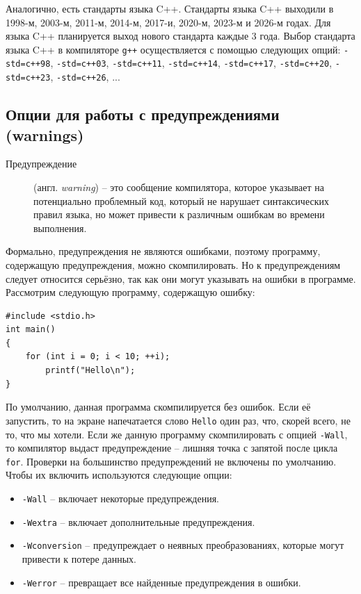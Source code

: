 \documentclass{article}
\begin{document}
Аналогично, есть стандарты языка C++. Стандарты языка C++ выходили в 1998-м, 2003-м, 2011-м, 2014-м, 2017-и, 2020-м, 2023-м и 2026-м годах. Для языка C++ планируется выход нового стандарта каждые 3 года. Выбор стандарта языка C++ в компиляторе \texttt{g++} осуществляется с помощью следующих опций: \texttt{-std=c++98}, \texttt{-std=c++03}, \texttt{-std=c++11}, \texttt{-std=c++14}, \texttt{-std=c++17}, \texttt{-std=c++20}, \texttt{-std=c++23}, \texttt{-std=c++26}, ...

\subsection*{Опции для работы с предупреждениями (warnings)}
\begin{description}
\item[Предупреждение] (англ. \textit{warning}) -- это сообщение компилятора, которое указывает на потенциально проблемный код, который не нарушает синтаксических правил языка, но может привести к различным ошибкам во времени выполнения.
\end{description}
Формально, предупреждения не являются ошибками, поэтому программу, содержащую предупреждения, можно скомпилировать. Но к предупреждениям следует относится серьёзно, так как они могут указывать на ошибки в программе. Рассмотрим следующую программу, содержащую ошибку:
\begin{lstlisting}[style=csMiptCppStyle]
#include <stdio.h>
int main()
{
    for (int i = 0; i < 10; ++i);
        printf("Hello\n");
}
\end{lstlisting}
По умолчанию, данная программа скомпилируется без ошибок. Если её запустить, то на экране напечатается слово \texttt{Hello} один раз, что, скорей всего, не то, что мы хотели. Если же данную программу скомпилировать с опцией \texttt{-Wall}, то компилятор выдаст предупреждение -- лишняя точка с запятой после цикла \texttt{for}. Проверки на большинство предупреждений не включены по умолчанию. Чтобы их включить используются следующие опции:

\begin{itemize}
\item \texttt{-Wall} -- включает некоторые предупреждения.
\item \texttt{-Wextra} -- включает дополнительные предупреждения.
\item \texttt{-Wconversion} -- предупреждает о неявных преобразованиях, которые могут привести к потере данных.
\item \texttt{-Werror} -- превращает все найденные предупреждения в ошибки.
\end{itemize}
\end{document}
